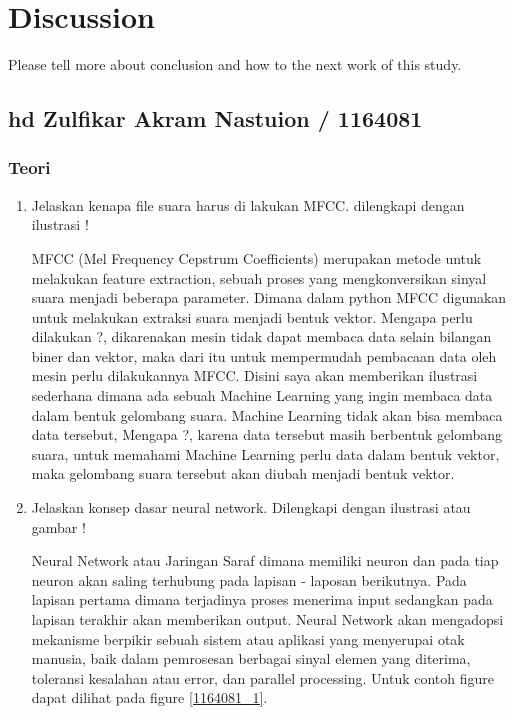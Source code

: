 \chapter{Discussion}
Please tell more about conclusion and how to the next work of this study.

\section{hd Zulfikar Akram Nastuion / 1164081}
\subsection{Teori}
\begin{enumerate}
\item Jelaskan kenapa file suara harus di lakukan MFCC. dilengkapi dengan ilustrasi !
\par
MFCC (Mel Frequency Cepstrum Coefficients) merupakan metode untuk melakukan feature extraction, sebuah proses yang mengkonversikan sinyal suara menjadi beberapa parameter. Dimana dalam python MFCC digunakan untuk melakukan extraksi suara menjadi bentuk vektor. Mengapa perlu dilakukan ?, dikarenakan mesin tidak dapat membaca data selain bilangan biner dan vektor, maka dari itu untuk mempermudah pembacaan data oleh mesin perlu dilakukannya MFCC. Disini saya akan memberikan ilustrasi sederhana dimana ada sebuah Machine Learning yang ingin membaca data dalam bentuk gelombang suara. Machine Learning tidak akan bisa membaca data tersebut, Mengapa ?, karena data tersebut masih berbentuk gelombang suara, untuk memahami Machine Learning perlu data dalam bentuk vektor, maka gelombang suara tersebut akan diubah menjadi bentuk vektor.
\item Jelaskan konsep dasar neural network. Dilengkapi dengan ilustrasi atau gambar !
\par
Neural Network atau Jaringan Saraf dimana memiliki neuron dan pada tiap neuron akan saling terhubung pada lapisan - laposan berikutnya. Pada lapisan pertama dimana terjadinya proses menerima input sedangkan pada lapisan terakhir akan memberikan output. Neural Network akan mengadopsi mekanisme berpikir sebuah sistem atau aplikasi yang menyerupai otak manusia, baik dalam pemrosesan berbagai sinyal elemen yang diterima, toleransi kesalahan atau error, dan parallel processing. Untuk contoh figure dapat dilihat pada figure \ref{1164081_1}.
	\begin{figure}[!htbp]

\end{figure}
\end{enumerate}
